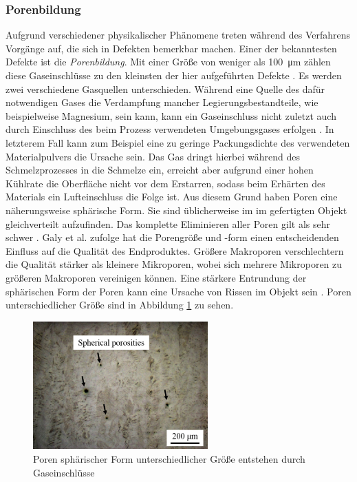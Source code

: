 		\subsubsection{Porenbildung}
		Aufgrund verschiedener physikalischer Phänomene treten während des Verfahrens Vorgänge auf,
		die sich in Defekten bemerkbar machen. Einer der bekanntesten Defekte ist die
		\emph{Porenbildung}. Mit einer Größe von weniger als \SI{100}{\micro\meter} zählen diese
		Gaseinschlüsse zu den kleinsten der hier aufgeführten Defekte \cite{zhang2017defect}. Es
		werden zwei verschiedene Gasquellen unterschieden. Während eine Quelle des dafür
		notwendigen Gases die Verdampfung mancher Legierungsbestandteile, wie beispielweise
		Magnesium, sein kann, kann ein Gaseinschluss nicht zuletzt auch durch Einschluss des beim
		Prozess verwendeten Umgebungsgases erfolgen \cite{galy2018main}. In letzterem Fall kann
		zum Beispiel eine zu geringe Packungsdichte des verwendeten Materialpulvers die Ursache
		sein. Das Gas dringt hierbei während des Schmelzprozesses in die Schmelze ein, erreicht
		aber aufgrund einer hohen Kühlrate die Oberfläche nicht vor dem Erstarren, sodass beim
		Erhärten des Materials ein Lufteinschluss die Folge ist. Aus diesem Grund haben Poren eine
		näherungsweise sphärische Form. Sie sind üblicherweise im im gefertigten Objekt
		gleichverteilt aufzufinden. Das komplette Eliminieren aller Poren gilt als sehr schwer
		\cite{zhang2017defect}. Galy et al. zufolge hat die Porengröße und -form einen
		entscheidenden Einfluss auf die Qualität des Endproduktes. Größere Makroporen
		verschlechtern die Qualität stärker als kleinere Mikroporen, wobei sich mehrere Mikroporen
		zu größeren Makroporen vereinigen können. Eine stärkere Entrundung der sphärischen Form
		der Poren kann eine Ursache von Rissen im Objekt sein \cite{galy2018main}. Poren
		unterschiedlicher Größe sind in Abbildung \ref{fig:defects_porosities} zu sehen.

		\begin{figure}[!ht]
			\centering
			\includegraphics[width=0.6\textwidth]{chapter/main/img/defects/porosities.png}
			\caption{Poren sphärischer Form unterschiedlicher Größe entstehen durch Gaseinschlüsse
			\cite{zhang2017defect}}
			\label{fig:defects_porosities}
		\end{figure}

